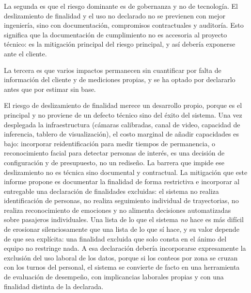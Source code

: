 La segunda es que el riesgo dominante es de gobernanza y no de
tecnología. El deslizamiento de finalidad y el uso no declarado no se
previenen con mejor ingeniería, sino con documentación, compromisos
contractuales y auditoría. Esto significa que la documentación de
cumplimiento no es accesoria al proyecto técnico: es la mitigación
principal del riesgo principal, y así debería exponerse ante el cliente.

La tercera es que varios impactos permanecen sin cuantificar por falta
de información del cliente y de mediciones propias, y se ha optado por
declararlo antes que por estimar sin base.

El riesgo de deslizamiento de finalidad merece un desarrollo propio,
porque es el principal y no proviene de un defecto técnico sino del
éxito del sistema. Una vez desplegada la infraestructura (cámaras
calibradas, canal de video, capacidad de inferencia, tablero de
visualización), el costo marginal de añadir capacidades es bajo:
incorporar reidentificación para medir tiempos de permanencia, o
reconocimiento facial para detectar personas de interés, es una decisión
de configuración y de presupuesto, no un rediseño. La barrera que impide
ese deslizamiento no es técnica sino documental y contractual. La
mitigación que este informe propone es documentar la finalidad de forma
restrictiva e incorporar al entregable una declaración de finalidades
excluidas: el sistema no realiza identificación de personas, no realiza
seguimiento individual de trayectorias, no realiza reconocimiento de
emociones y no alimenta decisiones automatizadas sobre pasajeros
individuales. Una lista de lo que el sistema \emph{no} hace es más
difícil de erosionar silenciosamente que una lista de lo que sí hace, y
su valor depende de que sea explícita: una finalidad excluida que solo
consta en el ánimo del equipo no restringe nada. A esa declaración
debería incorporarse expresamente la exclusión del uso laboral de los
datos, porque si los conteos por zona se cruzan con los turnos del
personal, el sistema se convierte de facto en una herramienta de
evaluación de desempeño, con implicancias laborales propias y con una
finalidad distinta de la declarada.

